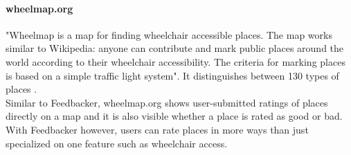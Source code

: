 \paragraph{wheelmap.org}
"Wheelmap is a map for finding wheelchair accessible places. The map works similar to Wikipedia: anyone can contribute and mark public places around the world according to their wheelchair accessibility. The criteria for marking places is based on a simple traffic light system". It distinguishes between 130 types of places \cite{wheel}.\\
Similar to Feedbacker, wheelmap.org shows user-submitted ratings of places directly on a map and it is also visible whether a place is rated as good or bad.\\
With Feedbacker however, users can rate places in more ways than just specialized on one feature such as wheelchair access.
